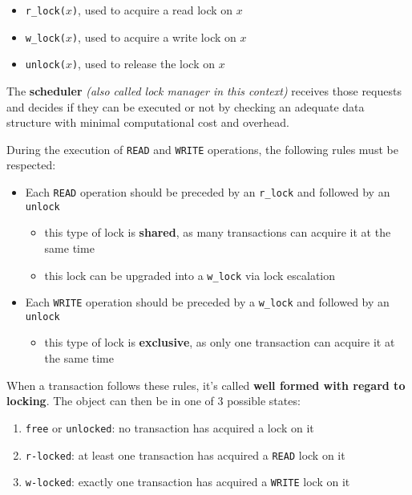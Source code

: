 \documentclass[english]{article}
\begin{document}
\begin{itemize}[label=\texttt{>}]
  \item \texttt{r\_lock(\(x\))}, used to acquire a read lock on \(x\)
  \item \texttt{w\_lock(\(x\))}, used to acquire a write lock on \(x\)
  \item \texttt{unlock(\(x\))}, used to release the lock on \(x\)
\end{itemize}

The \textbf{scheduler} \textit{(also called lock manager in this context)} receives those requests and decides if they can be executed or not by checking an adequate data structure with minimal computational cost and overhead.

During the execution of \texttt{READ} and \texttt{WRITE} operations, the following rules must be respected:

\begin{itemize}
  \item Each \texttt{READ} operation should be preceded by an \texttt{r\_lock} and followed by an \texttt{unlock}
        \begin{itemize}
          \item this type of lock is \textbf{shared}, as many transactions can acquire it at the same time
          \item this lock can be upgraded into a \texttt{w\_lock} via lock escalation
        \end{itemize}
  \item Each \texttt{WRITE} operation should be preceded by a \texttt{w\_lock} and followed by an \texttt{unlock}
        \begin{itemize}
          \item this type of lock is \textbf{exclusive}, as only one transaction can acquire it at the same time
        \end{itemize}
\end{itemize}

When a transaction follows these rules, it's called \textbf{well formed with regard to locking}.
The object can then be in one of \(3\) possible states:

\begin{enumerate}
  \item \texttt{free} or \texttt{unlocked}: no transaction has acquired a lock on it
  \item \texttt{r-locked}: at least one transaction has acquired a \texttt{READ} lock on it
  \item \texttt{w-locked}: exactly one transaction has acquired a \texttt{WRITE} lock on it
\end{enumerate}
\end{document}
